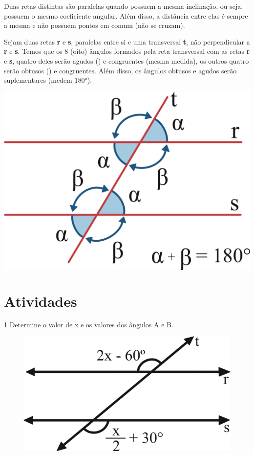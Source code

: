 {Duas retas distintas são paralelas quando possuem a mesma inclinação, ou
seja, possuem o mesmo coeficiente angular. Além disso, a distância entre
elas é sempre a mesma e não possuem pontos em comum (não se cruzam).

Sejam duas retas \textbf{r} e \textbf{s}, paralelas entre si e uma transversal 
\textbf{t}, não perpendicular a \textbf{r} e \textbf{s}. Temos que os 8 (oito)
ângulos formados pela reta transversal com as retas \textbf{r} e \textbf{s}, 
quatro deles serão agudos (\alpha) e congruentes (mesma medida), os outros quatro
serão obtusos (\beta) e congruentes. Além disso, os ângulos obtusos e agudos serão 
suplementares (medem 180°).

\includegraphics[width=.5\textwidth]{./ilustras-mat/modulo_11_exemplo.png}
}

\section{Atividades}

\num{1} Determine o valor de x e os valores dos ângulos A e B.

\begin{figure}[htpb!]
\centering
\includegraphics[width=.6\textwidth]{./ilustras-mat/modulo_11-atividade_1.png}
\end{figure}


\begin{emptybox}
\end{emptybox}

